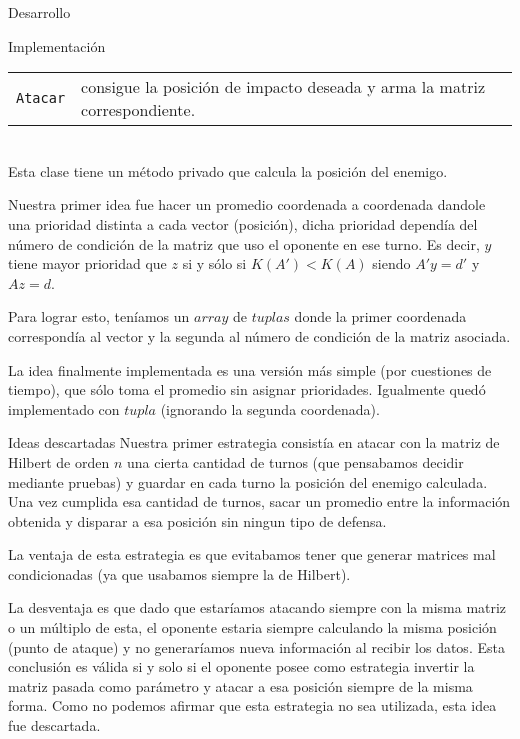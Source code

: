 \begin{section}{Desarrollo}
\begin{subsection}{Implementación}
		\begin{tabular}{rl}
			\texttt{Atacar} & consigue la posición de impacto deseada y arma la matriz correspondiente.\\
		\end{tabular}\\
		
		Esta clase tiene un método privado que calcula la posición del enemigo.
		
		Nuestra primer idea fue hacer un promedio coordenada a coordenada dandole una prioridad distinta a cada vector (posición), dicha prioridad dependía del número de condición de la matriz que uso el oponente en ese turno. Es decir, $y$ tiene mayor prioridad que $z$ si y sólo si $K(A')<K(A)$ siendo $A'y=d'$ y $Az=d$.
		
		Para lograr esto, teníamos un $array$ de $tuplas$ donde la primer coordenada correspondía al vector y la segunda al número de condición de la matriz asociada.
		
		La idea finalmente implementada es una versión más simple (por cuestiones de tiempo), que sólo toma el promedio sin asignar prioridades. Igualmente quedó implementado con $tupla$ (ignorando la segunda coordenada).
	\end{subsection}
	\begin{subsection}{Ideas descartadas}
		Nuestra primer estrategia consistía en atacar con la matriz de Hilbert de orden $n$ una cierta cantidad de turnos (que pensabamos decidir mediante pruebas) y guardar en cada turno la posición del enemigo calculada. Una vez cumplida esa cantidad de turnos, sacar un promedio entre la información obtenida y disparar a esa posición sin ningun tipo de defensa.
		
		La ventaja de esta estrategia es que evitabamos tener que generar matrices mal condicionadas (ya que usabamos siempre la de Hilbert).
		
		La desventaja es que dado que estaríamos atacando siempre con la misma matriz o un múltiplo de esta, el oponente estaria siempre calculando la misma posición (punto de ataque) y no generaríamos nueva información al recibir los datos. Esta conclusión es válida si y solo si el oponente posee como estrategia invertir la matriz pasada como parámetro y atacar a esa posición siempre de la misma forma. Como no podemos afirmar que esta estrategia no sea utilizada, esta idea fue descartada.
	\end{subsection}
\end{section}
